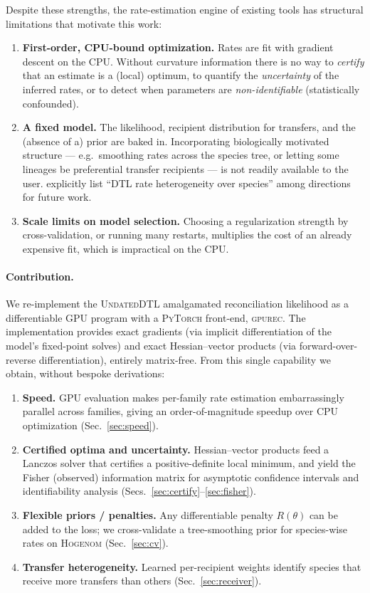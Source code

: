 \documentclass[11pt]{article}
\newcommand{\toolname}{\textsc{gpurec}\xspace}
\begin{document}
Despite these strengths, the rate-estimation engine of existing tools has
structural limitations that motivate this work:
\begin{enumerate}[leftmargin=1.4em,itemsep=2pt]
\item \textbf{First-order, CPU-bound optimization.} Rates are fit with
gradient descent on the CPU. Without curvature information there is no way to
\emph{certify} that an estimate is a (local) optimum, to quantify the
\emph{uncertainty} of the inferred rates, or to detect when parameters are
\emph{non-identifiable} (statistically confounded).
\item \textbf{A fixed model.} The likelihood, recipient distribution for
transfers, and the (absence of a) prior are baked in. Incorporating
biologically motivated structure --- e.g.\ smoothing rates across the species
tree, or letting some lineages be preferential transfer recipients --- is not
readily available to the user. \citet{Morel2024} explicitly list ``DTL rate
heterogeneity over species'' among directions for future work.
\item \textbf{Scale limits on model selection.} Choosing a regularization
strength by cross-validation, or running many restarts, multiplies the cost of
an already expensive fit, which is impractical on the CPU.
\end{enumerate}

\paragraph{Contribution.} We re-implement the \textsc{UndatedDTL} amalgamated
reconciliation likelihood as a differentiable GPU program with a
\textsc{PyTorch} front-end, \toolname. The implementation provides exact
gradients (via implicit differentiation of the model's fixed-point solves) and
exact Hessian--vector products (via forward-over-reverse differentiation),
entirely matrix-free. From this single capability we obtain, without
bespoke derivations:
\begin{enumerate}[leftmargin=1.4em,itemsep=2pt]
\item \textbf{Speed.} GPU evaluation makes per-family rate estimation
embarrassingly parallel across families, giving an order-of-magnitude speedup
over CPU optimization (Sec.~\ref{sec:speed}).
\item \textbf{Certified optima and uncertainty.} Hessian--vector products feed
a Lanczos solver that certifies a positive-definite local minimum, and yield
the Fisher (observed) information matrix for asymptotic confidence intervals
and identifiability analysis (Secs.~\ref{sec:certify}--\ref{sec:fisher}).
\item \textbf{Flexible priors / penalties.} Any differentiable penalty
$R(\theta)$ can be added to the loss; we cross-validate a tree-smoothing prior
for species-wise rates on \textsc{Hogenom} (Sec.~\ref{sec:cv}).
\item \textbf{Transfer heterogeneity.} Learned per-recipient weights identify
species that receive more transfers than others (Sec.~\ref{sec:receiver}).
\end{enumerate}
\end{document}
